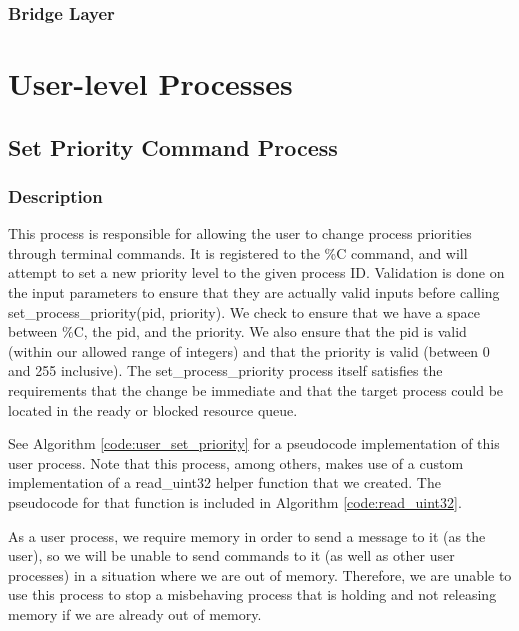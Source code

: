 \documentclass[12pt]{report}
\begin{document}
\section{Bridge Layer}

\part{User-level Processes}

\chapter{Set Priority Command Process}

\section{Description}
    This process is responsible for allowing the user to change process
    priorities through terminal commands.  It is registered to the \%C command,
    and will attempt to set a new priority level to the given process ID.
    Validation is done on the input parameters to ensure that they are actually
    valid inputs before calling set\_process\_priority(pid, priority).  We check
    to ensure that we have a space between \%C, the pid, and the priority.  We
    also ensure that the pid is valid (within our allowed range of integers) and
    that the priority is valid (between 0 and 255 inclusive).  The
    set\_process\_priority process itself satisfies the requirements that the
    change be immediate and that the target process could be located in the
    ready or blocked resource queue.

    See Algorithm \ref{code:user_set_priority} for a pseudocode implementation
    of this user process.  Note that this process, among others, makes use of
    a custom implementation of a read\_uint32 helper function that we created.
    The pseudocode for that function is included in Algorithm
    \ref{code:read_uint32}.

    As a user process, we require memory in order to send a message to it (as
    the user), so we will be unable to send commands to it (as well as other
    user processes) in a situation where we are out of memory.  Therefore, we
    are unable to use this process to stop a misbehaving process that is holding
    and not releasing memory if we are already out of memory.
\end{document}
